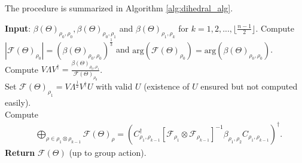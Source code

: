 \documentclass{article}
\theoremstyle{plain}
\theoremstyle{definition}
\theoremstyle{remark}
\begin{document}
The procedure is summarized in Algorithm \ref{alg:dihedral_alg}.
\begin{algorithm}[tb]
    \caption{Bispectrum inversion on the dihedral group $D_n$.}\label{alg:dihedral_alg}
    \small
    \begin{algorithmic}[1]
        \STATE \textbf{Input}: $\beta(\Theta)_{\rho_0,\rho_0}, \beta(\Theta)_{\rho_0,\rho_1}$ and $ \beta(\Theta)_{\rho_1,\rho_k}$ for $k=1,2,...,\lfloor\frac{n-1}{2}\rfloor$.
        \STATE Compute $|\mathcal{F}(\Theta)_{\rho_0}|=\left(\beta(\Theta)_{\rho_0,\rho_0}\right)^{\frac{1}{3}}$ and $\mathrm{arg}(\mathcal{F}(\Theta)_{\rho_0})=\mathrm{arg}(\beta(\Theta)_{\rho_0,\rho_0})$.
        \STATE Compute $V\Lambda V^\dagger = \frac{\beta(\Theta)_{\rho_0,\rho_1}} {\mathcal{F}(\Theta)_{\rho_0}}$.\\
        \STATE Set $\mathcal{F}(\Theta)_{\rho_1} = V\Lambda^\frac{1}{2} V^\dagger U$ with valid $U$ (existence of $U$ ensured but not computed easily).\\
            \STATE Compute \begin{align*}
                &\bigoplus_{\rho\in\rho_1\otimes\rho_{k-1}}\mathcal{F}(\Theta)_\rho =\left(C_{\rho_1,\rho_{k-1}}^{\dagger}\left[\mathcal{F}_{\rho_1}\otimes\mathcal{F}_{\rho_{k-1}}\right]^{-1}\beta_{\rho_1,\rho_2}C_{\rho_1,\rho_{k-1}}\right)^\dagger.
            \end{align*}
        \ENDFOR
        \STATE \textbf{Return} $\mathcal{F}(\Theta)$ (up to group action).
    \end{algorithmic}
\end{algorithm}
\end{document}
